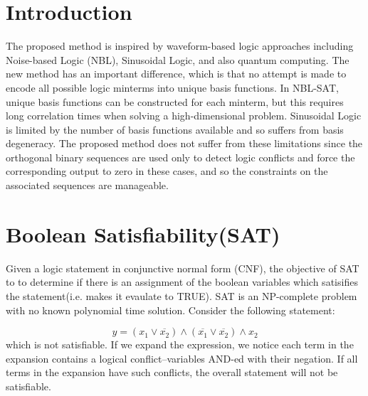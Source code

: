 \documentclass[reqno]{amsart}
\theoremstyle{definition}
\theoremstyle{remark}
\begin{document}
 \maketitle




\section{Introduction}
\noindent
The proposed method is inspired by waveform-based logic approaches including Noise-based Logic (NBL), Sinusoidal Logic, and also quantum computing. The new method has an important difference, which is that no attempt is made to encode all possible logic minterms into unique basis functions. In NBL-SAT, unique basis functions can be constructed for each minterm, but this requires long correlation times when solving a high-dimensional problem. Sinusoidal Logic is limited by the number of basis functions available and so suffers from basis degeneracy. The proposed method does not suffer from these limitations since the orthogonal binary sequences are used only to detect logic conflicts and force the corresponding output to zero in these cases, and so the constraints on the associated sequences are manageable.


\section{Boolean Satisfiability(SAT)}
\noindent
Given a logic statement in conjunctive normal form (CNF), the objective of SAT to to determine if there is an assignment of the boolean variables which satisifies the statement(i.e. makes it evaulate to TRUE). SAT is an NP-complete problem with no known polynomial time solution.  Consider the following statement:

\begin{equation}
y = (x_1\vee \overline{x_2})\wedge (\overline{x_1}\vee \overline{x_2})\wedge x_2
\end{equation}
\newline
\noindent
which is not satisfiable.  If we expand the expression, we notice each term in the expansion contains a logical conflict--variables AND-ed with their negation. If all terms in the expansion have such conflicts, the overall statement will not be satisfiable.
\end{document}
